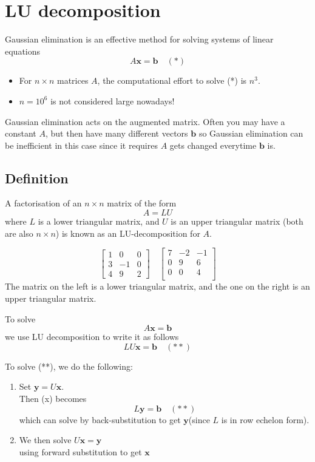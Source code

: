 \documentclass[11pt]{article}
\renewcommand{\vec}[1]{\mathbf{#1}}
\begin{document}
\section{LU decomposition}
Gaussian elimination is an effective method for solving systems of linear equations
\[ A \vec{x} = \vec{b} \quad (*) \]
\begin{itemize}
\item For $n \times n$ matrices $A$, the computational effort to solve (*) is $n^3$.
\item $n = 10^6$ is not considered large nowadays!
\end{itemize}

Gaussian elimination acts on the augmented matrix. Often you may have a constant $A$, but then have many different vectors $\vec{b}$ so Gaussian elimination can be inefficient in this case since it requires $A$ gets changed everytime $\vec{b}$ is.

\subsection{Definition}
A factorisation of an $n \times n$ matrix of the form
\[ A = LU \]
where $L$ is a lower triangular matrix, and $U$ is an upper triangular matrix (both are also $n \times n$) is known as an LU-decomposition for $A$.

\[ 
\begin{bmatrix}
1 & 0 & 0 \\
3 & -1 & 0 \\
4 & 9 & 2
\end{bmatrix}
\quad
\begin{bmatrix}
7 & -2 & -1 \\
0 & 9 & 6 \\
0 & 0 & 4 \\
\end{bmatrix}
\]
The matrix on the left is a lower triangular matrix, and the one on the right is an upper triangular matrix.

To solve
\[ A \vec{x} = \vec{b} \]
we use LU decomposition to write it as follows
\[ LU \vec{x} = \vec{b} \quad (**) \]

To solve (**), we do the following:
\begin{enumerate}[ (i) ]
\item Set $\vec{y} = U \vec{x}$.\\
Then (x) becomes
\[ L \vec{y} = \vec{b} \quad (**) \]
which can solve by back-substitution to get $\vec{y}$(since $L$ is in row echelon form).

\item We then solve $U \vec{x} = \vec{y}$\\
using forward substitution to get $\vec{x}$
\end{enumerate}
\end{document}
